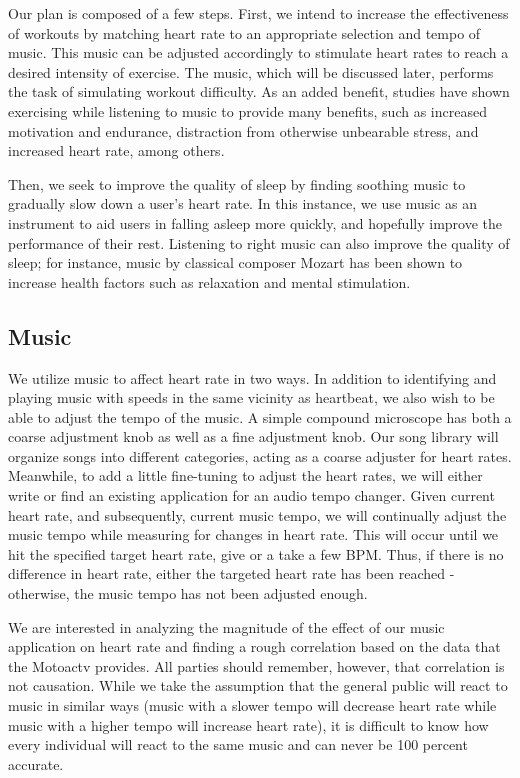 \documentclass[letterpaper,english, 12pt]{scrreprt}
\begin{document}
Our plan is composed of a few steps. First, we intend to increase the effectiveness of workouts by matching heart rate to an appropriate selection and tempo of music. This music can be adjusted accordingly to stimulate heart rates to reach a desired intensity of exercise. The music, which will be discussed later, performs the task of simulating workout difficulty. As an added benefit, studies have shown exercising while listening to music to provide many benefits, such as increased motivation and endurance, distraction from otherwise unbearable stress, and increased heart rate, among others.
			 
Then, we seek to improve the quality of sleep by finding soothing music to gradually slow down a user's heart rate. In this instance, we use music as an instrument to aid users in falling asleep more quickly, and hopefully improve the performance of their rest. Listening to right music can also improve the quality of sleep; for instance, music by classical composer Mozart has been shown to increase health factors such as relaxation and mental stimulation.
			 
\subsection{Music}
We utilize music to affect heart rate in two ways. In addition to identifying and playing music with speeds in the same vicinity as heartbeat, we also wish to be able to adjust the tempo of the music. A simple compound microscope has both a coarse adjustment knob as well as a fine adjustment knob. Our song library will organize songs into different categories, acting as a coarse adjuster for heart rates. Meanwhile, to add a little fine-tuning to adjust the heart rates, we will either write or find an existing application for an audio tempo changer. Given current heart rate, and subsequently, current music tempo, we will continually adjust the music tempo while measuring for changes in heart rate. This will occur until we hit the specified target heart rate, give or a take a few BPM. Thus, if there is no difference in heart rate, either the targeted heart rate has been reached - otherwise,  the music tempo has not been adjusted enough.
			 
We are interested in analyzing the magnitude of the effect of our music application on heart rate and finding a rough correlation based on the data that the Motoactv provides. All parties should remember, however, that correlation is not causation. While we take the assumption that the general public will react to music in similar ways (music with a slower tempo will decrease heart rate while music with a higher tempo will increase heart rate), it is difficult to know how every individual will react to the same music and can never be 100 percent accurate.
\end{document}
